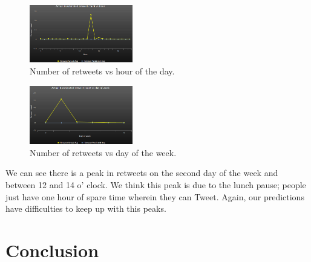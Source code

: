 \documentclass[10pt]{IEEEtran}
\begin{document}
\begin{figure}[h!]
\begin{center}
\includegraphics[width=0.4\textwidth]{images/srnn_hour_vs_retweet}
\caption{Number of retweets vs hour of the day. \label{result2}}
\end{center}
\end{figure}

\begin{figure}[h!]
\begin{center}
\includegraphics[width=0.4\textwidth]{images/srnn_day_of_week_vs_retweet}
\caption{Number of retweets vs day of the week. \label{result3}}
\end{center}
\end{figure}

We can see there is a peak in retweets on the second day of the week and between 12 and 14 o' clock. We think this peak is due to the lunch pause; people just have one hour of spare time wherein they can Tweet. Again, our predictions have difficulties to keep up with this peaks. 

\section{Conclusion}
\end{document}
